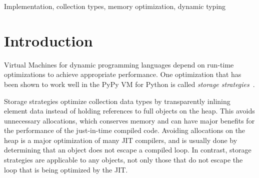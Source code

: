 \documentclass[english,10pt]{sigplanconf}
\begin{document}
\begin{abstract}
Storage strategies have been proposed as a run-time optimization
for the PyPy Python implementation and have shown promising results
for optimizing execution speed and memory requirements. However,
it remained unclear whether
the approach works equally well in other dynamic languages. Furthermore,
while PyPy is based on RPython, a language to write VMs with reusable
components such as a tracing just-in-time compiler and garbage collection,
the strategies design itself was not generalized to be reusable across languages
implemented using that same toolchain.

In this paper, we present a general design and implementation for storage
strategies and show how they can be re-used across different RPython-based
languages. We evaluate the performance of our implementation for RSqueak, an 
RPython-based VM for Squeak/Smalltalk and show that storage strategies may
indeed offer performance benefits for certain workloads in other dynamic programming 
languages. We furthermore
evaluate the generality of our implementation by applying it to Topaz, a
Ruby VM, and Pycket, a Racket implementation.
\end{abstract}

\keywords
Implementation, collection types, memory optimization, dynamic typing 

\section{Introduction}

Virtual Machines for dynamic programming languages depend on run-time
optimizations to achieve appropriate performance.  One optimization
that has been shown to work well in the PyPy VM for Python is called
\emph{storage strategies}~\cite{strategies}.

Storage strategies optimize collection data types by
transparently inlining element data instead of holding
references to full objects on the heap. This avoids unnecessary allocations,
which conserves memory and can have major benefits for the performance of
the just-in-time compiled code. Avoiding allocations on the heap
is a major optimization of many JIT compilers, and is usually done by
determining that an object does not escape a compiled loop. In contrast,
storage strategies are applicable to any
objects, not only those that do not escape the loop that is being
optimized by the JIT.
\end{document}
